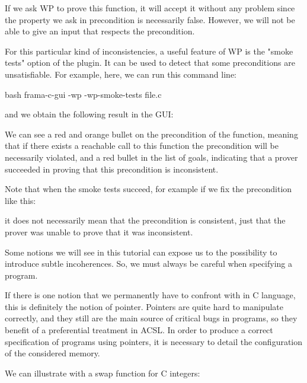 

If we ask WP to prove this function, it will accept it without any problem
since the property we ask in precondition is necessarily false.
However, we will not be able to give an input that respects the
precondition.


For this particular kind of inconsistencies, a useful feature of WP is
the "smoke tests" option of the plugin. It can be used to detect that
some preconditions are unsatisfiable. For example, here, we can run this
command line:


\begin{CodeBlock}{bash}
  frama-c-gui -wp -wp-smoke-tests file.c
\end{CodeBlock}


and we obtain the following result in the GUI:




We can see a red and orange bullet on the precondition of the function,
meaning that if there exists a reachable call to this function the
precondition will be necessarily violated, and a red bullet in the
list of goals, indicating that a prover succeeded in proving that this
precondition is inconsistent.


Note that when the smoke tests succeed, for example if we fix the
precondition like this:




it does not necessarily mean that the precondition is consistent, just
that the prover was unable to prove that it was inconsistent.


Some notions we will see in this tutorial can expose us to the
possibility to introduce subtle incoherences. So, we must always be
careful when specifying a program.




If there is one notion that we permanently have to confront with in C
language, this is definitely the notion of pointer. Pointers are quite
hard to manipulate correctly, and they still are the main source of
critical bugs in programs, so they benefit of a preferential treatment
in ACSL. In order to produce a correct specification of programs using
pointers, it is necessary to detail the configuration of the considered
memory.

We can illustrate with a swap function for C integers:






